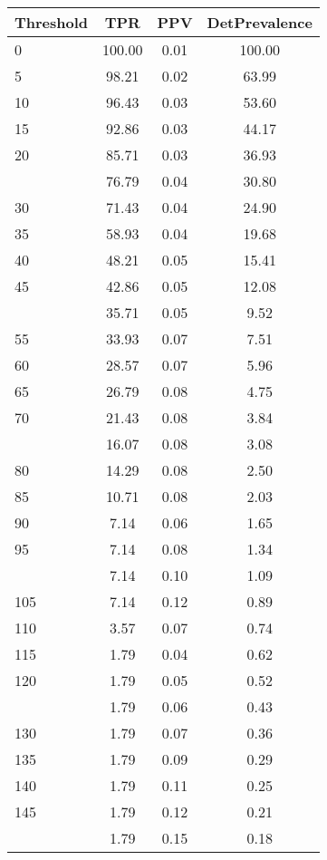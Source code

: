 \begin{table}[ht]
\centering
\begin{tabular}{lccc}
  \toprule
Threshold & TPR & PPV & DetPrevalence \\ 
  \midrule
0 & 100.00 & 0.01 & 100.00 \\ 
  5 & 98.21 & 0.02 & 63.99 \\ 
  10 & 96.43 & 0.03 & 53.60 \\ 
  15 & 92.86 & 0.03 & 44.17 \\ 
  20 & 85.71 & 0.03 & 36.93 \\ 
   \addlinespace
25 & 76.79 & 0.04 & 30.80 \\ 
  30 & 71.43 & 0.04 & 24.90 \\ 
  35 & 58.93 & 0.04 & 19.68 \\ 
  40 & 48.21 & 0.05 & 15.41 \\ 
  45 & 42.86 & 0.05 & 12.08 \\ 
   \addlinespace
50 & 35.71 & 0.05 & 9.52 \\ 
  55 & 33.93 & 0.07 & 7.51 \\ 
  60 & 28.57 & 0.07 & 5.96 \\ 
  65 & 26.79 & 0.08 & 4.75 \\ 
  70 & 21.43 & 0.08 & 3.84 \\ 
   \addlinespace
75 & 16.07 & 0.08 & 3.08 \\ 
  80 & 14.29 & 0.08 & 2.50 \\ 
  85 & 10.71 & 0.08 & 2.03 \\ 
  90 & 7.14 & 0.06 & 1.65 \\ 
  95 & 7.14 & 0.08 & 1.34 \\ 
   \addlinespace
100 & 7.14 & 0.10 & 1.09 \\ 
  105 & 7.14 & 0.12 & 0.89 \\ 
  110 & 3.57 & 0.07 & 0.74 \\ 
  115 & 1.79 & 0.04 & 0.62 \\ 
  120 & 1.79 & 0.05 & 0.52 \\ 
   \addlinespace
125 & 1.79 & 0.06 & 0.43 \\ 
  130 & 1.79 & 0.07 & 0.36 \\ 
  135 & 1.79 & 0.09 & 0.29 \\ 
  140 & 1.79 & 0.11 & 0.25 \\ 
  145 & 1.79 & 0.12 & 0.21 \\ 
   \addlinespace
150 & 1.79 & 0.15 & 0.18 \\ 

\end{tabular}
\end{table}
